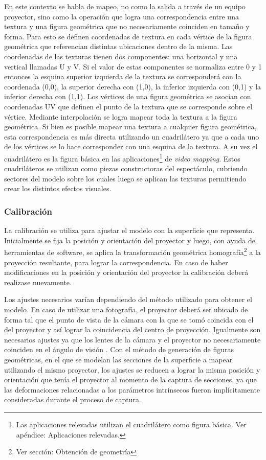 En este contexto se habla de mapeo, no como la salida a través de un equipo proyector, sino como la operación que logra una correspondencia entre una textura y una figura geométrica que no necesariamente coinciden en tamaño y forma. Para esto se definen coordenadas de textura en cada vértice de la figura geométrica que referencian distintas ubicaciones dentro de la misma.
Las coordenadas de las texturas tienen dos componentes: una horizontal y una vertical llamadas U y V. Si el valor de estas componentes se normaliza entre 0 y 1 entonces la esquina superior izquierda de la textura se corresponderá con la coordenada (0,0), la superior derecha con (1,0), la inferior izquierda con (0,1) y la inferior derecha con (1,1).
Los vértices de una figura geométrica se asocian con coordenadas UV que definen el punto de la textura que se corresponde sobre el vértice. Mediante interpolación se logra mapear toda la textura a la figura geométrica.
Si bien es posible mapear una textura a cualquier figura geométrica, esta correspondencia es más directa utilizando un cuadrilátero ya que a cada uno de los vértices se lo hace corresponder con una esquina de la textura. A su vez el cuadrilátero es la figura básica en las aplicaciones\footnote{Las aplicaciones relevadas utilizan el cuadrilátero como figura básica. Ver apéndice: Aplicaciones relevadas.} de \emph{video mapping}.
Estos cuadriláteros se utilizan como piezas constructoras del espectáculo, cubriendo sectores del modelo sobre los cuales luego se aplican las texturas permitiendo crear los distintos efectos visuales.

\subsubsection{Calibración}
La calibración se utiliza para ajustar el modelo con la superficie que representa. Inicialmente se fija la posición y orientación del proyector y luego, con ayuda de herramientas de software, se aplica la transformación geométrica homografía\footnote{Ver sección: Obtención de geometría} a la proyección resultante, para lograr la correspondencia.
En caso de haber modificaciones en la posición y orientación del proyector la calibración deberá realizase nuevamente. %

Los ajustes necesarios varían dependiendo del método utilizado para obtener el modelo. En caso de utilizar una fotografía, el proyector deberá ser ubicado de forma tal que el punto de vista de la cámara con la que se tomó coincida con el del proyector y así lograr la coincidencia del centro de proyección. Igualmente son necesarios ajustes ya que los lentes de la cámara y el proyector no necesariamente coinciden en el ángulo de visión \cite{LibroCompGrafica2}\cite{LibroPhotographicOptics}. Con el método de generación de figuras geométricas, en el que se modelan las secciones de la superficie a mapear utilizando el mismo proyector, los ajustes se reducen a lograr la misma posición y orientación que tenía el proyector al momento de la captura de secciones, ya que las deformaciones relacionadas a los parámetros intrínsecos fueron implícitamente consideradas durante el proceso de captura.

